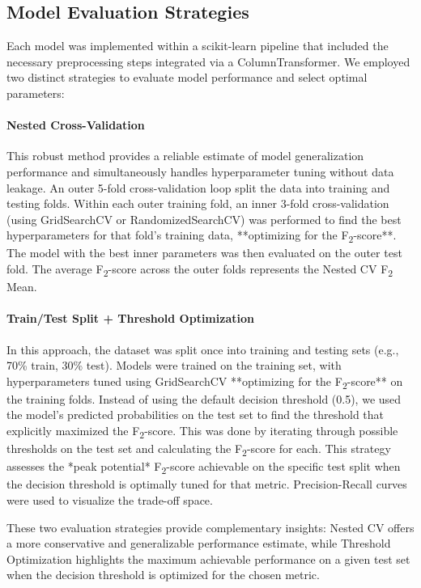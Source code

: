 \documentclass{article}
\begin{document}
\subsection{Model Evaluation Strategies}
\label{sec:evaluation_strategies} %

Each model was implemented within a scikit-learn pipeline that included the necessary preprocessing steps integrated via a ColumnTransformer. We employed two distinct strategies to evaluate model performance and select optimal parameters:

\paragraph{Nested Cross-Validation}
This robust method provides a reliable estimate of model generalization performance and simultaneously handles hyperparameter tuning without data leakage. An outer 5-fold cross-validation loop split the data into training and testing folds. Within each outer training fold, an inner 3-fold cross-validation (using GridSearchCV or RandomizedSearchCV) was performed to find the best hyperparameters for that fold's training data, **optimizing for the F\textsubscript{2}-score**. The model with the best inner parameters was then evaluated on the outer test fold. The average F\textsubscript{2}-score across the outer folds represents the Nested CV F\textsubscript{2} Mean.

\paragraph{Train/Test Split + Threshold Optimization}
In this approach, the dataset was split once into training and testing sets (e.g., 70\% train, 30\% test). Models were trained on the training set, with hyperparameters tuned using GridSearchCV **optimizing for the F\textsubscript{2}-score** on the training folds. Instead of using the default decision threshold (0.5), we used the model's predicted probabilities on the test set to find the threshold that explicitly maximized the F\textsubscript{2}-score. This was done by iterating through possible thresholds on the test set and calculating the F\textsubscript{2}-score for each. This strategy assesses the *peak potential* F\textsubscript{2}-score achievable on the specific test split when the decision threshold is optimally tuned for that metric. Precision-Recall curves were used to visualize the trade-off space.

These two evaluation strategies provide complementary insights: Nested CV offers a more conservative and generalizable performance estimate, while Threshold Optimization highlights the maximum achievable performance on a given test set when the decision threshold is optimized for the chosen metric.
\end{document}
